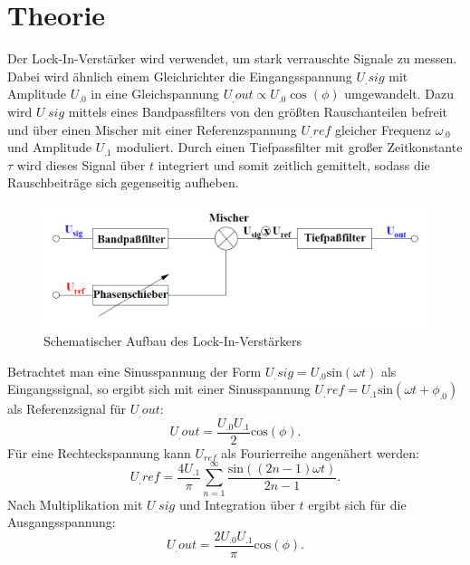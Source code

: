 
\section{Theorie}
\label{sec:Theorie}

Der Lock-In-Verstärker wird verwendet, um stark verrauschte Signale zu messen. Dabei wird ähnlich einem Gleichrichter die Eingangsspannung $U_.{sig}$ mit Amplitude $U_.0$ in eine Gleichspannung $U_.{out}\propto U_.0\cos(\phi)$ umgewandelt. Dazu wird $U_.{sig}$ mittels eines Bandpassfilters von den größten Rauschanteilen befreit und über einen Mischer mit einer Referenzspannung $U_.{ref}$ gleicher Frequenz $\omega_.0$ und Amplitude $U_.1$ moduliert.
Durch einen Tiefpassfilter mit großer Zeitkonstante $\tau$ wird dieses Signal über $t$ integriert und somit zeitlich gemittelt, sodass die Rauschbeiträge sich gegenseitig aufheben.
\begin{figure}
	\centering
	\includegraphics[width=\linewidth-70pt,height=\textheight-70pt,keepaspectratio]{content/images/schematischerAufbau.png}
	\caption{Schematischer Aufbau des Lock-In-Verstärkers\cite{V303}}
	\label{fig:schematischerAufbau}
\end{figure}

\noindent Betrachtet man eine Sinusspannung der Form $U_.{sig}=U_.0\text{sin}(\omega t)$ als Eingangssignal, so ergibt sich mit einer Sinusspannung $U_.{ref}=U_.1\text{sin}(\omega t+\phi_.0)$ als Referenzsignal für $U_.{out}$:
\begin{equation}
U_.{out} = \frac{U_.0U_.1}{2}\text{cos}(\phi)\text{.}
\end{equation}
Für eine Rechteckspannung kann $U_{ref}$ als Fourierreihe angenähert werden:
\begin{equation}
U_.{ref} = \frac{4U_.1}{\pi}\sum_{n=1}^{\infty}\frac{\text{sin}((2n-1)\omega t)}{2n-1}\text{.}
\end{equation}
Nach Multiplikation mit $U_.{sig}$ und Integration über $t$ ergibt sich für die Ausgangsspannung:
\begin{equation}
U_.{out} = \frac{2U_.0U_.1}{\pi}\text{cos}(\phi)\text{.}
\end{equation}
